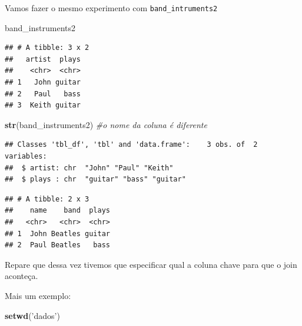 \documentclass[]{book}
\newenvironment{Shaded}{\begin{snugshade}}{\end{snugshade}}
\newcommand{\KeywordTok}[1]{\textcolor[rgb]{0.13,0.29,0.53}{\textbf{#1}}}
\newcommand{\DataTypeTok}[1]{\textcolor[rgb]{0.13,0.29,0.53}{#1}}
\newcommand{\StringTok}[1]{\textcolor[rgb]{0.31,0.60,0.02}{#1}}
\newcommand{\CommentTok}[1]{\textcolor[rgb]{0.56,0.35,0.01}{\textit{#1}}}
\newcommand{\OperatorTok}[1]{\textcolor[rgb]{0.81,0.36,0.00}{\textbf{#1}}}
\newcommand{\NormalTok}[1]{#1}
\begin{document}
Vamos fazer o mesmo experimento com \texttt{band\_intruments2}

\begin{Shaded}
\begin{Highlighting}[]
\NormalTok{band_instruments2}
\end{Highlighting}
\end{Shaded}

\begin{verbatim}
## # A tibble: 3 x 2
##   artist  plays
##    <chr>  <chr>
## 1   John guitar
## 2   Paul   bass
## 3  Keith guitar
\end{verbatim}

\begin{Shaded}
\begin{Highlighting}[]
\KeywordTok{str}\NormalTok{(band_instruments2) }\CommentTok{#o nome da coluna é diferente}
\end{Highlighting}
\end{Shaded}

\begin{verbatim}
## Classes 'tbl_df', 'tbl' and 'data.frame':    3 obs. of  2 variables:
##  $ artist: chr  "John" "Paul" "Keith"
##  $ plays : chr  "guitar" "bass" "guitar"
\end{verbatim}

\begin{Shaded}
\end{Shaded}

\begin{verbatim}
## # A tibble: 2 x 3
##    name    band  plays
##   <chr>   <chr>  <chr>
## 1  John Beatles guitar
## 2  Paul Beatles   bass
\end{verbatim}

Repare que dessa vez tivemos que especificar qual a coluna chave para
que o join aconteça.

Mais um exemplo:

\begin{Shaded}
\begin{Highlighting}[]
\KeywordTok{setwd}\NormalTok{(}\StringTok{'dados'}\NormalTok{)}
\end{Highlighting}
\end{Shaded}
\end{document}
